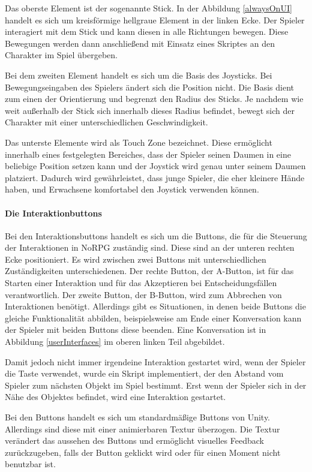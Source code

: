 				Das oberste Element ist der sogenannte Stick. In der Abbildung \ref{alwaysOnUI} handelt es sich um kreisförmige hellgraue Element in der linken Ecke. Der Spieler interagiert mit dem Stick und kann diesen in alle Richtungen bewegen. Diese Bewegungen werden dann anschließend mit Einsatz eines Skriptes an den Charakter im Spiel übergeben. 
				
				Bei dem zweiten Element handelt es sich um die Basis des Joysticks. Bei Bewegungseingaben des Spielers ändert sich die Position nicht. Die Basis dient zum einen der Orientierung und begrenzt den Radius des Sticks. Je nachdem wie weit außerhalb der Stick sich innerhalb dieses Radius befindet, bewegt sich der Charakter mit einer unterschiedlichen Geschwindigkeit.
				
				Das unterste Elemente wird als Touch Zone bezeichnet. Diese ermöglicht innerhalb eines festgelegten Bereiches, dass der Spieler seinen Daumen in eine beliebige Position setzen kann und der Joystick wird genau unter seinem Daumen platziert. Dadurch wird gewährleistet, dass junge Spieler, die eher kleinere Hände haben, und Erwachsene komfortabel den Joystick verwenden können.
				
			\paragraph{Die Interaktionbuttons}
				Bei den Interaktionsbuttons handelt es sich um die Buttons, die für die Steuerung der Interaktionen in NoRPG zuständig sind. Diese sind an der unteren rechten Ecke positioniert. Es wird zwischen zwei Buttons mit unterschiedlichen Zuständigkeiten unterschiedenen. Der rechte Button, der A-Button, ist für das Starten einer Interaktion und für das Akzeptieren bei Entscheidungsfällen verantwortlich. Der zweite Button, der B-Button, wird zum Abbrechen von Interaktionen benötigt. Allerdings gibt es Situationen, in denen beide Buttons die gleiche Funktionalität abbilden, beispielsweise am Ende einer Konversation kann der Spieler mit beiden Buttons diese beenden. Eine Konversation ist in Abbildung \ref{userInterfaces} im oberen linken Teil abgebildet.
				
				Damit jedoch nicht immer irgendeine Interaktion gestartet wird, wenn der Spieler die Taste verwendet, wurde ein Skript implementiert, der den Abstand vom Spieler zum nächsten Objekt im Spiel bestimmt. Erst wenn der Spieler sich in der Nähe des Objektes befindet, wird eine Interaktion gestartet.
				
				Bei den Buttons handelt es sich um standardmäßige Buttons von Unity. Allerdings sind diese mit einer animierbaren Textur überzogen. Die Textur verändert das aussehen des Buttons und ermöglicht visuelles Feedback zurückzugeben, falls der Button geklickt wird oder für einen Moment nicht benutzbar ist.
				
